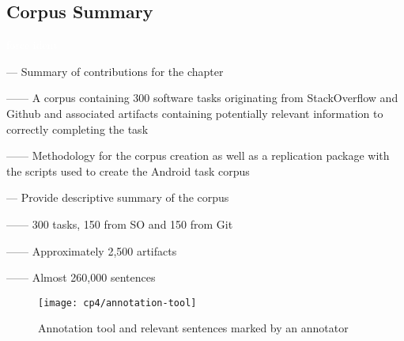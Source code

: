







\subsection{Corpus Summary}
\textcolor{white}{force ident} %


--- Summary of contributions for the chapter \vspace{3mm}

------ A corpus containing 300 software tasks originating from StackOverflow and Github and associated artifacts containing potentially relevant information to correctly completing the task \vspace{3mm}

------ Methodology for the corpus creation as well as a replication package with the scripts used to create the Android task corpus \vspace{3mm}


--- Provide descriptive summary of the corpus

------ 300 tasks, 150 from SO and 150 from Git

------ Approximately 2,500 artifacts

------ Almost 260,000 sentences





\begin{figure}
    \centering
    \texttt{[image: cp4/annotation-tool]}
    \caption{Annotation tool and relevant sentences marked by an annotator}
    \label{fig:corpus-annotation-tool}
\end{figure}









% 


